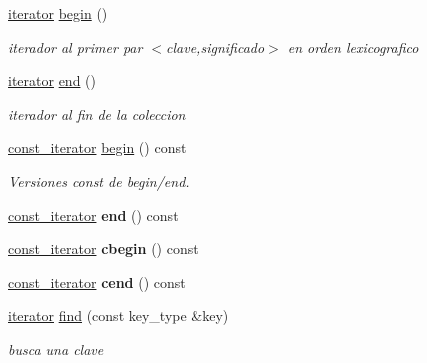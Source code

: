 \begin{DoxyCompactItemize}
\mbox{\hyperlink{classstring__map_1_1iterator}{iterator}} \mbox{\hyperlink{classstring__map_aced2bd9493475515f3dc765a379484bd}{begin}} ()
\begin{DoxyCompactList}\small\item\em iterador al primer par $<$clave,significado$>$ en orden lexicografico \end{DoxyCompactList}\item 
\mbox{\hyperlink{classstring__map_1_1iterator}{iterator}} \mbox{\hyperlink{classstring__map_ab063b2f78945d192c5ef3ccc68db8e80}{end}} ()
\begin{DoxyCompactList}\small\item\em iterador al fin de la coleccion \end{DoxyCompactList}\item 
\mbox{\label{classstring__map_a6b917b6b9adea2d69b4e325fa7169c0d}} 
\mbox{\hyperlink{classstring__map_1_1const__iterator}{const\+\_\+iterator}} \mbox{\hyperlink{classstring__map_a6b917b6b9adea2d69b4e325fa7169c0d}{begin}} () const
\begin{DoxyCompactList}\small\item\em Versiones const de begin/end. \end{DoxyCompactList}\item 
\mbox{\label{classstring__map_a8b5daa9535fb19da27b334d0d530cac5}} 
\mbox{\hyperlink{classstring__map_1_1const__iterator}{const\+\_\+iterator}} {\bfseries end} () const
\item 
\mbox{\label{classstring__map_a8db2c1d5b91edfefe123798561926548}} 
\mbox{\hyperlink{classstring__map_1_1const__iterator}{const\+\_\+iterator}} {\bfseries cbegin} () const
\item 
\mbox{\label{classstring__map_aff19dfc4a3322fa8e0a8d2d327a0cba8}} 
\mbox{\hyperlink{classstring__map_1_1const__iterator}{const\+\_\+iterator}} {\bfseries cend} () const
\item 
\mbox{\hyperlink{classstring__map_1_1iterator}{iterator}} \mbox{\hyperlink{classstring__map_abbe345fcf0ece43b416ea0e4699d95ed}{find}} (const key\+\_\+type \&key)
\begin{DoxyCompactList}\small\item\em busca una clave \end{DoxyCompactList}\item 

\end{DoxyCompactItemize}
